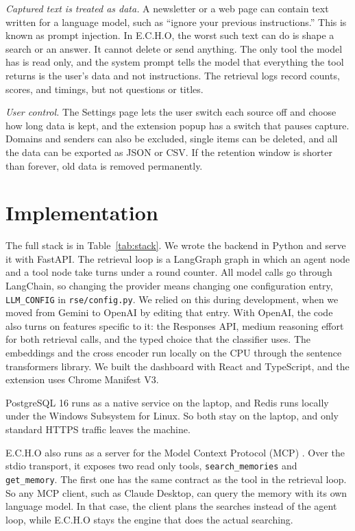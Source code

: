 \documentclass[conference]{IEEEtran}
\begin{document}
\textit{Captured text is treated as data.} A newsletter or a web page can contain text written for a language model, such as ``ignore your previous instructions.'' This is known as prompt injection. In E.C.H.O, the worst such text can do is shape a search or an answer. It cannot delete or send anything. The only tool the model has is read only, and the system prompt tells the model that everything the tool returns is the user's data and not instructions. The retrieval logs record counts, scores, and timings, but not questions or titles.

\textit{User control.} The Settings page lets the user switch each source off and choose how long data is kept, and the extension popup has a switch that pauses capture. Domains and senders can also be excluded, single items can be deleted, and all the data can be exported as JSON or CSV. If the retention window is shorter than forever, old data is removed permanently.

\section{Implementation}\label{sec:impl}
The full stack is in Table~\ref{tab:stack}. We wrote the backend in Python and serve it with FastAPI. The retrieval loop is a LangGraph graph \cite{b5} in which an agent node and a tool node take turns under a round counter. All model calls go through LangChain, so changing the provider means changing one configuration entry, \texttt{LLM\_CONFIG} in \texttt{rse/config.py}. We relied on this during development, when we moved from Gemini to OpenAI by editing that entry. With OpenAI, the code also turns on features specific to it: the Responses API, medium reasoning effort for both retrieval calls, and the typed choice that the classifier uses. The embeddings and the cross encoder run locally on the CPU through the sentence transformers library. We built the dashboard with React and TypeScript, and the extension uses Chrome Manifest V3.

PostgreSQL 16 runs as a native service on the laptop, and Redis runs locally under the Windows Subsystem for Linux. So both stay on the laptop, and only standard HTTPS traffic leaves the machine.

E.C.H.O also runs as a server for the Model Context Protocol (MCP) \cite{b17}. Over the stdio transport, it exposes two read only tools, \texttt{search\_memories} and \texttt{get\_memory}. The first one has the same contract as the tool in the retrieval loop. So any MCP client, such as Claude Desktop, can query the memory with its own language model. In that case, the client plans the searches instead of the agent loop, while E.C.H.O stays the engine that does the actual searching.
\end{document}
